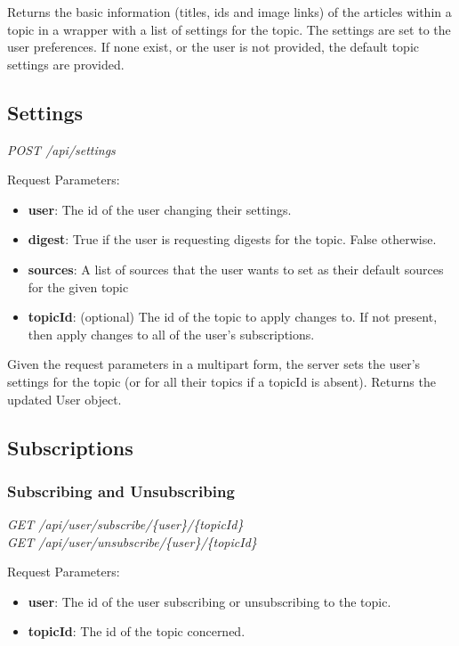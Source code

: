 \documentclass[12pt]{article}
\begin{document}
\begin{appendices}
Returns the basic information (titles, ids and image links) of the articles within a topic in a wrapper with a list of settings for the topic. The settings are set to the user preferences. If none exist, or the user is not provided, the default topic settings are provided.

\subsection{Settings}

\emph{POST	/api/settings}

Request Parameters:
\begin{itemize}
	\item \textbf{user}: The id of the user changing their settings.
	\item \textbf{digest}: True if the user is requesting digests for the topic. False otherwise.
	\item \textbf{sources}: A list of sources that the user wants to set as their default sources for the given topic
	\item \textbf{topicId}: (optional) The id of the topic to apply changes to. If not present, then apply changes to all of the user's subscriptions.
\end{itemize}

Given the request parameters in a multipart form, the server sets the user's settings for the topic (or for all their topics if a topicId is absent). Returns the updated User object.

\subsection{Subscriptions}

\subsubsection{Subscribing and Unsubscribing}

\emph{GET	/api/user/subscribe/\{user\}/\{topicId\}}\\
\emph{GET	/api/user/unsubscribe/\{user\}/\{topicId\}}

Request Parameters:
\begin{itemize}
	\item \textbf{user}: The id of the user subscribing or unsubscribing to the topic.
	\item \textbf{topicId}: The id of the topic concerned.
\end{itemize}


\end{appendices}
\end{document}
